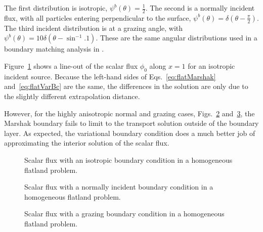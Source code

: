 The first distribution is isotropic, $\psi^b(\theta) = \frac{1}{2}$. The second
is a normally incident flux, with all particles entering
perpendicular to the surface, $\psi^b(\theta) = \delta(\theta -
\frac{\pi}{2})$. The third incident distribution is at a grazing angle, with 
$\psi^b(\theta) = 10 \delta(\theta - \sin^{-1}.1)$.
These are the same angular distributions used in a boundary matching analysis
in \cite{Dav2006}.

Figure~\ref{fig:isotropic} shows a line-out of the scalar flux $\phi_0$ along
$x=1$ for an isotropic incident source. Because the left-hand sides of
Eqs.~\eqref{eq:flatMarshak} and~\eqref{eq:flatVarBc} are the same, the
differences in the solution are only due to the slightly different
extrapolation distance.

However, for the highly anisotropic normal and grazing cases,
Figs.~\ref{fig:delta} and~\ref{fig:grazing}, the Marshak boundary fails to
limit to the transport solution outside of the boundary layer. As
expected, the variational boundary condition does a much better job of
approximating the interior solution of the scalar flux.

\begin{figure}[htb!]
  \centering\small
  \hspace{-.5in}
  
  \hspace{-.5in}
  \caption{Scalar flux with an isotropic boundary condition in a homogeneous
  flatland problem.}
  \label{fig:isotropic}
\end{figure}

\begin{figure}[htb!]
  \centering\small
  \hspace{-.5in}
  
  \hspace{-.5in}
  \caption{Scalar flux with a normally incident boundary condition in a
  homogeneous flatland problem.}
  \label{fig:delta}
\end{figure}

\begin{figure}[htb!]
  \centering\small
  \hspace{-.5in}
  
  \hspace{-.5in}
  \caption{Scalar flux with a grazing boundary condition in a homogeneous
  flatland problem.}
  \label{fig:grazing}
\end{figure}

